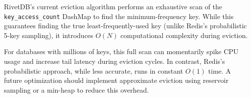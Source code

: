 RivetDB's current eviction algorithm performs an exhaustive scan of the \texttt{key\_access\_count} DashMap to find the minimum-frequency key. While this guarantees finding the true least-frequently-used key (unlike Redis's probabilistic 5-key sampling), it introduces $O(N)$ computational complexity during eviction.

For databases with millions of keys, this full scan can momentarily spike CPU usage and increase tail latency during eviction cycles. In contrast, Redis's probabilistic approach, while less accurate, runs in constant $O(1)$ time. A future optimization should implement approximate eviction using reservoir sampling or a min-heap to reduce this overhead.

